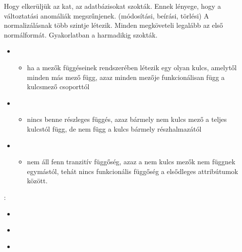 \documentclass[main.tex]{subfiles}
\begin{document}
  Hogy elkerüljük az kat, az adatbázisokat
   szokták. Ennek lényege, hogy a
  változtatási anomáliák megszűnjenek. (módosítási, beírási,
  törlési) A normalizálásnak több szintje létezik.
  Minden  megköveteli legalább
  az első normálformát. Gyakorlatban a harmadikig szokták.
  \begin{itemize}
    \item {}
    \begin{itemize}
      \item ha a mezők függéseinek rendszerében
      létezik egy olyan kulcs, amelytől minden
      más mező függ, azaz minden mezője 
      funkcionálisan függ a kulcsmező csoporttól
    \end{itemize}
    
    \item {}
    \begin{itemize}
      \item nincs benne részleges függés, azaz bármely nem
      kulcs mező a teljes kulcstól függ, de nem függ a
      kulcs bármely részhalmazától
    \end{itemize}

    \item {}
    \begin{itemize}
      \item nem áll fenn tranzitív függőség, azaz
      a nem kulcs mezők nem függnek egymástól,
      tehát nincs funkcionális függőség a 
      elsődleges attribútumok között.
    \end{itemize}
  \end{itemize}

  {\large {}}:
  \begin{itemize}
    \item {} 
    \\ \hspace*{\fill}

    \item {} 
    \\ \hspace*{\fill}

    \item {} 
     
    \\ \hspace*{\fill}
  \end{itemize}
\end{document}
